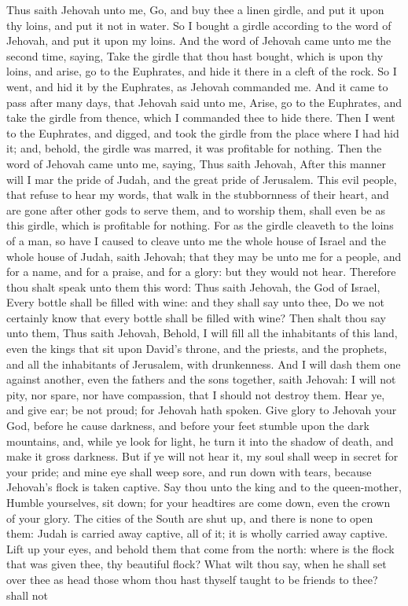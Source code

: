Thus saith Jehovah unto me, Go, and buy thee a linen girdle, and put it upon thy loins, and put it not in water. So I bought a girdle according to the word of Jehovah, and put it upon my loins. And the word of Jehovah came unto me the second time, saying, Take the girdle that thou hast bought, which is upon thy loins, and arise, go to the Euphrates, and hide it there in a cleft of the rock. So I went, and hid it by the Euphrates, as Jehovah commanded me. And it came to pass after many days, that Jehovah said unto me, Arise, go to the Euphrates, and take the girdle from thence, which I commanded thee to hide there. Then I went to the Euphrates, and digged, and took the girdle from the place where I had hid it; and, behold, the girdle was marred, it was profitable for nothing.  Then the word of Jehovah came unto me, saying, Thus saith Jehovah, After this manner will I mar the pride of Judah, and the great pride of Jerusalem. This evil people, that refuse to hear my words, that walk in the stubbornness of their heart, and are gone after other gods to serve them, and to worship them, shall even be as this girdle, which is profitable for nothing. For as the girdle cleaveth to the loins of a man, so have I caused to cleave unto me the whole house of Israel and the whole house of Judah, saith Jehovah; that they may be unto me for a people, and for a name, and for a praise, and for a glory: but they would not hear.  Therefore thou shalt speak unto them this word: Thus saith Jehovah, the God of Israel, Every bottle shall be filled with wine: and they shall say unto thee, Do we not certainly know that every bottle shall be filled with wine? Then shalt thou say unto them, Thus saith Jehovah, Behold, I will fill all the inhabitants of this land, even the kings that sit upon David’s throne, and the priests, and the prophets, and all the inhabitants of Jerusalem, with drunkenness. And I will dash them one against another, even the fathers and the sons together, saith Jehovah: I will not pity, nor spare, nor have compassion, that I should not destroy them.  Hear ye, and give ear; be not proud; for Jehovah hath spoken. Give glory to Jehovah your God, before he cause darkness, and before your feet stumble upon the dark mountains, and, while ye look for light, he turn it into the shadow of death, and make it gross darkness. But if ye will not hear it, my soul shall weep in secret for your pride; and mine eye shall weep sore, and run down with tears, because Jehovah’s flock is taken captive.  Say thou unto the king and to the queen-mother, Humble yourselves, sit down; for your headtires are come down, even the crown of your glory. The cities of the South are shut up, and there is none to open them: Judah is carried away captive, all of it; it is wholly carried away captive.  Lift up your eyes, and behold them that come from the north: where is the flock that was given thee, thy beautiful flock? What wilt thou say, when he shall set over thee as head those whom thou hast thyself taught to be friends to thee? shall not 